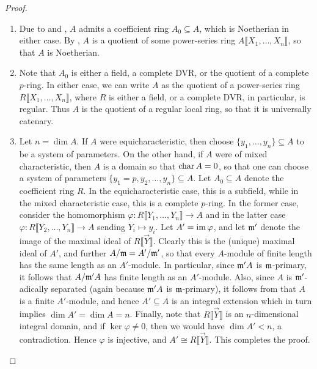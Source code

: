 \begin{proof}
\begin{enumerate}[label=(\arabic*)]
    \item Due to  and , $A$ admits a coefficient ring $A_0\subseteq A$, which is Noetherian in either case. By , $A$ is a quotient of some power-series ring $A\llbracket X_1,\dots,X_n\rrbracket$, so that $A$ is Noetherian. 
    
    \item Note that $A_0$ is either a field, a complete DVR, or the quotient of a complete $p$-ring. In either case, we can write $A$ as the quotient of a power-series ring $R\llbracket X_1,\dots, X_n\rrbracket$, where $R$ is either a field, or a complete DVR, in particular, is regular. Thus $A$ is the quotient of a regular local ring, so that it is universally catenary. 
    
    \item Let $n = \dim A$. If $A$ were equicharacteristic, then choose $\{y_1,\dots,y_n\}\subseteq A$ to be a system of parameters. On the other hand, if $A$ were of mixed characteristic, then $A$ is a domain so that $\operatorname{char} A = 0$, so that one can choose a system of parameters $\{y_1 = p, y_2,\dots, y_n\}\subseteq A$. Let $A_0\subseteq A$ denote the coefficient ring $R$. In the equicharacteristic case, this is a subfield, while in the mixed characteristic case, this is a complete $p$-ring. In the former case, consider the homomorphism $\varphi\colon R\llbracket Y_1,\dots, Y_n\rrbracket\to A$ and in the latter case $\varphi\colon R\llbracket Y_2,\dots, Y_n\rrbracket\to A$ sending $Y_i\mapsto y_i$. Let $A' = \operatorname{im}\varphi$, and let $\mathfrak{m}'$ denote the image of the maximal ideal of $R\llbracket \vec Y\rrbracket$. Clearly this is the (unique) maximal ideal of $A'$, and further $A/\mathfrak{m} = A'/\mathfrak{m}'$, so that every $A$-module of finite length has the same length as an $A'$-module. In particular, since $\mathfrak{m}' A$ is $\mathfrak{m}$-primary, it follows that $A/\mathfrak{m}' A$ has finite length as an $A'$-module. Also, since $A$ is $\mathfrak{m}'$-adically separated (again because $\mathfrak{m}'A$ is $\mathfrak{m}$-primary), it follows from  that $A$ is a finite $A'$-module, and hence $A'\subseteq A$ is an integral extension which in turn implies $\dim A' = \dim A = n$. Finally, note that $R\llbracket\vec Y\rrbracket$ is an $n$-dimensional integral domain, and if $\ker\varphi\ne 0$, then we would have $\dim A' < n$, a contradiction. Hence $\varphi$ is injective, and $A'\cong R\llbracket\vec Y\rrbracket$. This completes the proof. \qedhere
\end{enumerate}
\end{proof}

